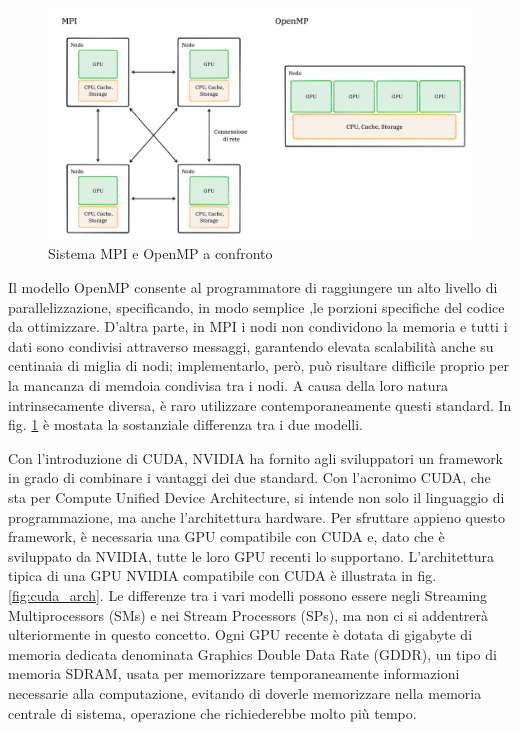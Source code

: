 \begin{figure}[ht]
    \centering
    \includegraphics[width=.9\linewidth]{images/chapter2/mpi_openmp.png}
    \caption{Sistema MPI e OpenMP a confronto}
    \label{fig:mpi_openmp}
\end{figure}

Il modello OpenMP consente al programmatore di raggiungere un alto livello di parallelizzazione, specificando, in modo semplice ,le porzioni specifiche del codice da ottimizzare. D'altra parte, in MPI i nodi non condividono la memoria e tutti i dati sono condivisi attraverso messaggi, garantendo elevata scalabilità anche su centinaia di miglia di nodi; implementarlo, però,  può risultare difficile proprio per la mancanza di memdoia condivisa tra i nodi. A causa della loro natura intrinsecamente diversa, è raro utilizzare contemporaneamente questi standard. In fig. \ref{fig:mpi_openmp} è mostata la sostanziale differenza tra i due modelli.

Con l'introduzione di CUDA, NVIDIA ha fornito agli sviluppatori un framework in grado di combinare i vantaggi dei due standard. Con l'acronimo CUDA, che sta per Compute Unified Device Architecture, si intende non solo il linguaggio di programmazione, ma anche l'architettura hardware. Per sfruttare appieno questo framework, è necessaria una GPU compatibile con CUDA e, dato che è sviluppato da NVIDIA, tutte le loro GPU recenti lo supportano. L'architettura tipica di una GPU NVIDIA compatibile con CUDA è illustrata in fig. \ref{fig:cuda_arch}. Le differenze tra i vari modelli possono essere negli Streaming Multiprocessors (SMs) e nei Stream Processors (SPs), ma non ci si addentrerà ulteriormente in questo concetto. Ogni GPU recente è dotata di gigabyte di memoria dedicata denominata Graphics Double Data Rate (GDDR), un tipo di memoria SDRAM, usata per memorizzare temporaneamente informazioni necessarie alla computazione, evitando di doverle memorizzare nella memoria centrale di sistema, operazione che richiederebbe molto più tempo.


